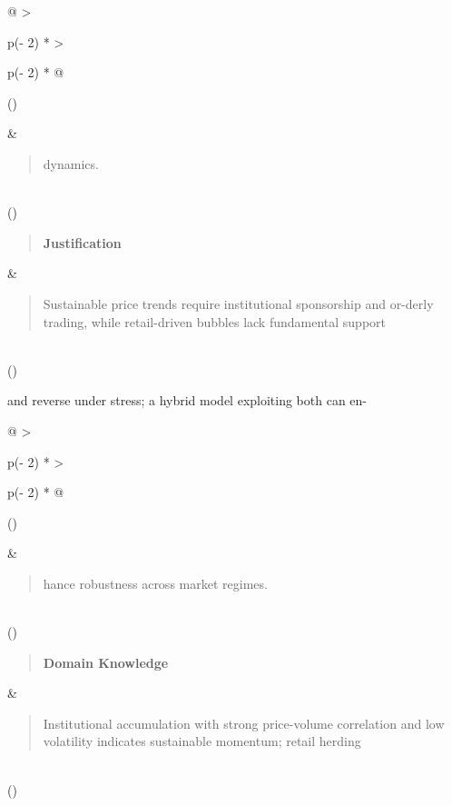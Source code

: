 \documentclass[
]{article}
\begin{document}
\begin{longtable}[]{@{}
  >{\raggedright\arraybackslash}p{(\columnwidth - 2\tabcolsep) * }
  >{\raggedright\arraybackslash}p{(\columnwidth - 2\tabcolsep) * }@{}}
\toprule()
\begin{minipage}[b]{\linewidth}\raggedright
\end{minipage} & \begin{minipage}[b]{\linewidth}\raggedright
\begin{quote}
dynamics.
\end{quote}
\end{minipage} \\
\midrule()
\endhead
\begin{minipage}[t]{\linewidth}\raggedright
\begin{quote}
\textbf{Justification}
\end{quote}
\end{minipage} & \begin{minipage}[t]{\linewidth}\raggedright
\begin{quote}
Sustainable price trends require institutional sponsorship and or-derly
trading, while retail-driven bubbles lack fundamental support
\end{quote}
\end{minipage} \\
\bottomrule()
\end{longtable}

and reverse under stress; a hybrid model exploiting both can en-

\begin{longtable}[]{@{}
  >{\raggedright\arraybackslash}p{(\columnwidth - 2\tabcolsep) * }
  >{\raggedright\arraybackslash}p{(\columnwidth - 2\tabcolsep) * }@{}}
\toprule()
\begin{minipage}[b]{\linewidth}\raggedright
\end{minipage} & \begin{minipage}[b]{\linewidth}\raggedright
\begin{quote}
hance robustness across market regimes.
\end{quote}
\end{minipage} \\
\midrule()
\endhead
\begin{minipage}[t]{\linewidth}\raggedright
\begin{quote}
\textbf{Domain Knowledge}
\end{quote}
\end{minipage} & \begin{minipage}[t]{\linewidth}\raggedright
\begin{quote}
Institutional accumulation with strong price-volume correlation and low
volatility indicates sustainable momentum; retail herding
\end{quote}
\end{minipage} \\
\bottomrule()
\end{longtable}
\end{document}
